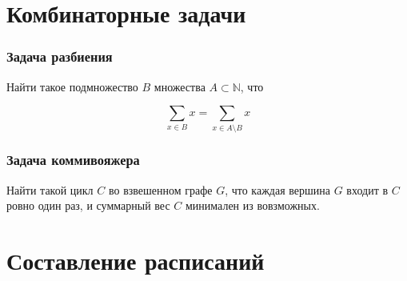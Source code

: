 \documentclass[24pt,pdf,hyperref={unicode},aspectratio=169]{beamer}
\newcommand{\seg}[4]{
\draw[draw=#4] (#1,#3) -- (#2,#3);
\draw[draw=#4] ($(#1,#3)-(0,0.1)$) -- ($(#1,#3)+(0,0.1)$);
\draw[draw=#4] ($(#2,#3)-(0,0.1)$) -- ($(#2,#3)+(0,0.1)$);
}
\newcommand{\segb}[3]{\seg{#1}{#2}{#3}{black}}
\begin{document}
\section{Комбинаторные задачи}


\begin{frame}\frametitle{Задача разбиения}

Найти такое подмножество $B$ множества $A\subset \mathbb{N}$, что 

$$
\sum_{x\in B} x = \sum_{x\in A\setminus B} x
$$

\end{frame}

\begin{frame}\frametitle{Задача коммивояжера}


Найти такой цикл $C$ во взвешенном графе $G$, что каждая вершина $G$ входит в $C$ ровно один раз, и суммарный вес $C$ минимален из вовзможных.
\end{frame}


\section{Составление расписаний}

\begin{frame}
\begin{center}
\end{center}
\end{frame}

\begin{frame}
\begin{center}
\end{center}
\end{frame}

\begin{frame}
\begin{center}
\end{center}
\end{frame}
\end{document}
